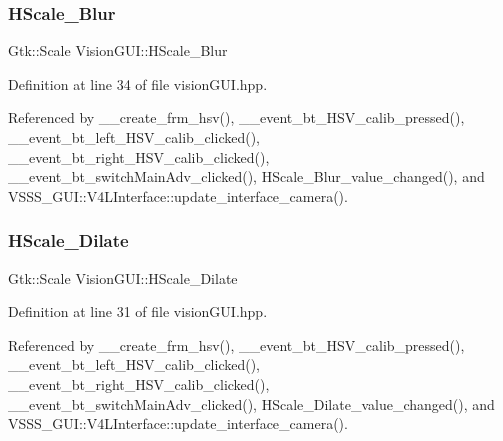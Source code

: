 \mbox{\label{class_vision_g_u_i_a88fa2852521012287ae804404280c57f}} 
\subsubsection{\texorpdfstring{H\+Scale\+\_\+\+Blur}{HScale\_Blur}}
{\footnotesize\ttfamily Gtk\+::\+Scale Vision\+G\+U\+I\+::\+H\+Scale\+\_\+\+Blur}



Definition at line 34 of file vision\+G\+U\+I.\+hpp.



Referenced by \+\_\+\+\_\+create\+\_\+frm\+\_\+hsv(), \+\_\+\+\_\+event\+\_\+bt\+\_\+\+H\+S\+V\+\_\+calib\+\_\+pressed(), \+\_\+\+\_\+event\+\_\+bt\+\_\+left\+\_\+\+H\+S\+V\+\_\+calib\+\_\+clicked(), \+\_\+\+\_\+event\+\_\+bt\+\_\+right\+\_\+\+H\+S\+V\+\_\+calib\+\_\+clicked(), \+\_\+\+\_\+event\+\_\+bt\+\_\+switch\+Main\+Adv\+\_\+clicked(), H\+Scale\+\_\+\+Blur\+\_\+value\+\_\+changed(), and V\+S\+S\+S\+\_\+\+G\+U\+I\+::\+V4\+L\+Interface\+::update\+\_\+interface\+\_\+camera().

\mbox{\label{class_vision_g_u_i_a6a7c757a11a2699e841b6b49fe18d1de}} 
\subsubsection{\texorpdfstring{H\+Scale\+\_\+\+Dilate}{HScale\_Dilate}}
{\footnotesize\ttfamily Gtk\+::\+Scale Vision\+G\+U\+I\+::\+H\+Scale\+\_\+\+Dilate}



Definition at line 31 of file vision\+G\+U\+I.\+hpp.



Referenced by \+\_\+\+\_\+create\+\_\+frm\+\_\+hsv(), \+\_\+\+\_\+event\+\_\+bt\+\_\+\+H\+S\+V\+\_\+calib\+\_\+pressed(), \+\_\+\+\_\+event\+\_\+bt\+\_\+left\+\_\+\+H\+S\+V\+\_\+calib\+\_\+clicked(), \+\_\+\+\_\+event\+\_\+bt\+\_\+right\+\_\+\+H\+S\+V\+\_\+calib\+\_\+clicked(), \+\_\+\+\_\+event\+\_\+bt\+\_\+switch\+Main\+Adv\+\_\+clicked(), H\+Scale\+\_\+\+Dilate\+\_\+value\+\_\+changed(), and V\+S\+S\+S\+\_\+\+G\+U\+I\+::\+V4\+L\+Interface\+::update\+\_\+interface\+\_\+camera().

